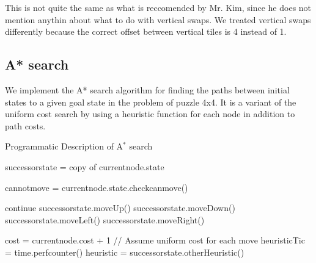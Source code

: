\documentclass{article}
\begin{document}
This is not quite the same as what is reccomended by Mr. Kim, since he does not mention anythin about what to do with vertical swaps. We treated vertical swaps differently because the correct offset between vertical tiles is 4 instead of 1. 

\subsection{A* search}
We implement the A* search algorithm for finding the paths between initial states to a given goal state in the problem of puzzle 4x4. It is a variant of the uniform cost search by using a heuristic function for each node in addition to path costs.
\begin{algorithm}[h]
  
  \caption{Programmatic Description of A$^*$ search}
   
        
    
    \EndIf


            \State successorstate = copy of currentnode.state
            
            \State cannotmove = currentnode.state.checkcanmove()
            
            \State continue
            \EndIf
            \State successorstate.moveUp()
            \EndIf
            \State successorstate.moveDown()
            \EndIf
            \State successorstate.moveLeft()
            \EndIf
            \State successorstate.moveRight()
            \EndIf

            \State cost = currentnode.cost + 1  // Assume uniform cost for each move
            \State heuristicTic = time.perfcounter()
            \State heuristic = successorstate.otherHeuristic()
           

\end{algorithm}
\end{document}
